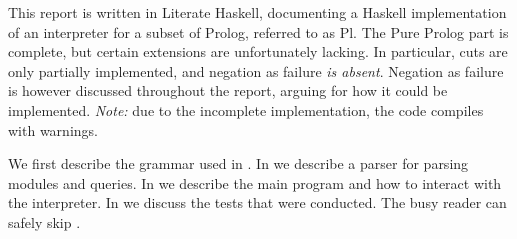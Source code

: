 This report is written in Literate Haskell, documenting a Haskell
implementation of an interpreter for a subset of Prolog, referred to as Pl. The
Pure Prolog part is complete, but certain extensions are unfortunately lacking.
In particular, cuts are only partially implemented, and negation as failure
\emph{is absent}. Negation as failure is however discussed throughout the
report, arguing for how it could be implemented. \emph{Note:} due to the
incomplete implementation, the code compiles with warnings.

We first describe the grammar used in . In
 we describe a parser for parsing modules and queries.
In  we describe the main program and how to interact with
the interpreter. In  we discuss the tests that were
conducted. The busy reader can safely skip .
